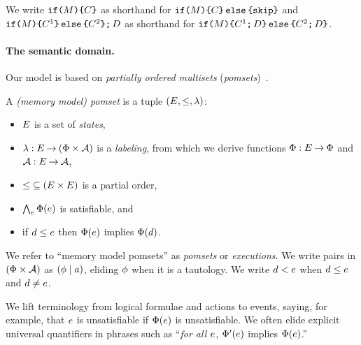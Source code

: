 We write
$\texttt{if}\allowbreak\texttt{(}M\texttt{)} \allowbreak\texttt{\{} C \texttt{\}}$ as shorthand for
$\texttt{if}\allowbreak\texttt{(}M\texttt{)} \allowbreak\texttt{\{} C\texttt{\}}\,\allowbreak\texttt{else}\allowbreak\,\texttt{\{} \texttt{skip}\texttt{\}}$ and
$\texttt{if}\allowbreak\texttt{(}M\texttt{)} \allowbreak\texttt{\{} C^1 \texttt{\}}\,\allowbreak\texttt{else}\allowbreak\,\texttt{\{} C^2 \texttt{\}} \texttt{;}\,\allowbreak D$ as shorthand for
$\texttt{if}\allowbreak\texttt{(}M\texttt{)} \allowbreak\texttt{\{} C^1 \texttt{;}\,\allowbreak D\texttt{\}}\,\allowbreak\texttt{else}\allowbreak\,\texttt{\{} C^2 \texttt{;}\,\allowbreak D\texttt{\}}$.

\paragraph{The semantic domain.}
Our model is based on \emph{partially ordered multisets} (\emph{pomsets})~\cite{GISCHER1988199}.
\begin{definition}
  \label{def:mmpomset}
  A \emph{(memory model) pomset} is a tuple
  $(\Event, {\le}, %
  \labeling)$: %
  \begin{itemize}
  \item $E$ is a set of \emph{states},
  \item $\lambda: E \mathbin\rightarrow (\Phi\times\mathcal{A})$ is a \emph{labeling},
    from which we derive functions $\Phi:E\mathbin\rightarrow\Phi$ and $\mathcal{A}:E\mathbin\rightarrow\mathcal{A}$,
  \item ${\le} \subseteq (E\times E)$ is a partial order, 
  \item $\bigwedge_{e}\Phi(e)$ is satisfiable, and
  \item if $d\le e$ then $\Phi(e)$ implies
    $\Phi(d)$.
  \end{itemize}
\end{definition}
We refer to ``memory model pomsets'' as \emph{pomsets} or \emph{executions}.
We write pairs in $(\Phi\times\mathcal{A})$ as $(\phi \mid a)$, eliding
$\phi$ when it is a tautology.
We write $d<e$ when $d\le e$ and $d\neq e$.

We lift terminology from logical formulae and actions to events, saying, for example,
that $e$ is unsatisfiable if $\Phi(e)$ is unsatisfiable. %
We often elide explicit universal quantifiers in phrases such as
``\emph{for all $e$}, $\Phi'(e)$ implies $\Phi(e)$.''


